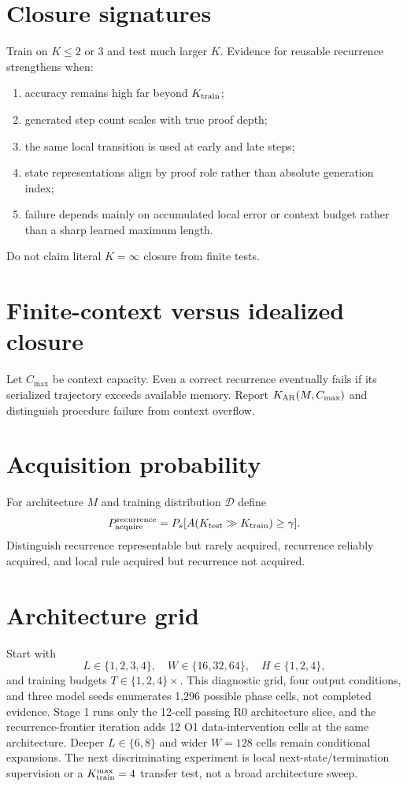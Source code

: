 \documentclass[10pt]{article}
\begin{document}
\section{Closure signatures}
Train on $K\le2$ or $3$ and test much larger $K$. Evidence for reusable recurrence strengthens when:
\begin{enumerate}
\item accuracy remains high far beyond $K_{\rm train}$;
\item generated step count scales with true proof depth;
\item the same local transition is used at early and late steps;
\item state representations align by proof role rather than absolute generation index;
\item failure depends mainly on accumulated local error or context budget rather than a sharp learned maximum length.
\end{enumerate}
Do not claim literal $K=\infty$ closure from finite tests.

\section{Finite-context versus idealized closure}
Let $C_{\max}$ be context capacity. Even a correct recurrence eventually fails if its serialized trajectory exceeds available memory. Report $K_{\rm AR}(M,C_{\max})$ and distinguish procedure failure from context overflow.

\section{Acquisition probability}
For architecture $M$ and training distribution $\mathcal D$ define
\[
P_{\rm acquire}^{\rm recurrence}=P_s[A(K_{\rm test}\gg K_{\rm train})\ge\gamma].
\]
Distinguish recurrence representable but rarely acquired, recurrence reliably acquired, and local rule acquired but recurrence not acquired.

\section{Architecture grid}
Start with
\[
L\in\{1,2,3,4\},\quad W\in\{16,32,64\},\quad H\in\{1,2,4\},
\]
and training budgets $T\in\{1,2,4\}\times$. This diagnostic grid, four output conditions, and three model seeds enumerates 1,296 possible phase cells, not completed evidence. Stage 1 runs only the 12-cell passing R0 architecture slice, and the recurrence-frontier iteration adds 12 O1 data-intervention cells at the same architecture. Deeper $L\in\{6,8\}$ and wider $W=128$ cells remain conditional expansions. The next discriminating experiment is local next-state/termination supervision or a $K_{\rm train}^{\max}=4$ transfer test, not a broad architecture sweep.
\end{document}
